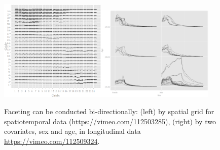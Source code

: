 \documentclass[12pt]{article}
\begin{document}
\begin{figure}[htp]
\begin{center}
\includegraphics[width=0.45\textwidth]{graph/pipeline-24-4}\includegraphics[width=0.5\textwidth]{graph/pipeline-25-2}

\caption{\label{fig:faceting-examples}Faceting can be conducted bi-directionally: (left) by spatial grid for spatiotemporal data (\url{https://vimeo.com/112503285}), (right) by two covariates, sex and age, in longitudinal data \url{https://vimeo.com/112509324}.}
\end{center}
\end{figure}


\end{document}
